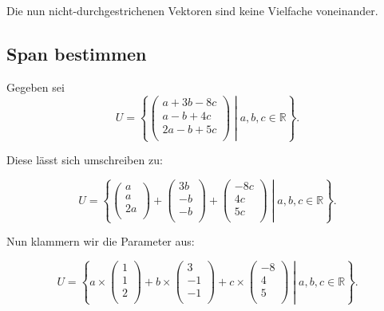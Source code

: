\documentclass{scrartcl}
\begin{document}
Die nun nicht-durchgestrichenen Vektoren sind keine Vielfache voneinander.

\subsection{Span bestimmen}

Gegeben sei 
\begin{equation}
	U = \left\{\begin{pmatrix*}
		a + 3b - 8c \\
		a - b + 4c \\
		2a -b + 5c\\
	\end{pmatrix*}\middle| a, b, c \in \mathbb{R} \right\}.
\end{equation}

Diese lässt sich umschreiben zu:

\begin{equation}
	U = \left\{\begin{pmatrix*}
		a \\
		a \\
		2a \\
	\end{pmatrix*} + \begin{pmatrix*}
		3b \\
		-b \\
		-b \\
	\end{pmatrix*}+ \begin{pmatrix*}
		-8c \\
		4c \\
		5c \\
	\end{pmatrix*}
	\middle| a, b, c \in \mathbb{R} \right\}.
\end{equation}

Nun klammern wir die Parameter aus:

\begin{equation}
	U = \left\{a\times \begin{pmatrix*}
		1 \\
		1 \\
		2 \\
	\end{pmatrix*} + b\times \begin{pmatrix*}
		3 \\
		-1 \\
		-1 \\
	\end{pmatrix*}+ c\times \begin{pmatrix*}
		-8 \\
		4 \\
		5 \\
	\end{pmatrix*}
	\middle| a, b, c \in \mathbb{R} \right\}.
\end{equation}
\end{document}

